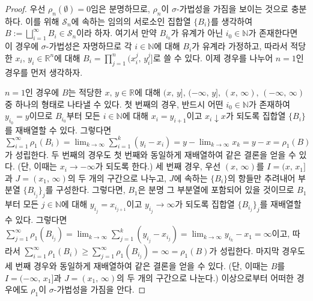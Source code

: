 \begin{proof}
    우선 $\rho_n(\emptyset)=0$임은 분명하므로, $\rho_n$이 $\sigma$-가법성을 가짐을 보이는 것으로 충분하다. 이를 위해 $\mathcal{S}_n$에 속하는 임의의 서로소인 집합열 $\{B_i\}$를 생각하여 $B:=\bigsqcup_{i=1}^\infty B_i\in\mathcal{S}_n$이라 하자. 여기서 만약 $B_{i_0}$가 유계가 아닌 $i_0\in\mathbb{N}$가 존재한다면 이 경우에 $\sigma$-가법성은 자명하므로 각 $i\in\mathbb{N}$에 대해 $B_i$가 유계라 가정하고, 따라서 적당한 $x_i,\,y_i\in\mathbb{R}^n$에 대해 $B_i=\prod_{j=1}^n(x_i^j,\,y_i^j]$로 쓸 수 있다. 이제 경우를 나누어 $n=1$인 경우를 먼저 생각하자.

    $n=1$인 경우에 $B$는 적당한 $x,\,y\in\mathbb{R}$에 대해 $(x,\,y],\,(-\infty,\,y],\,(x,\,\infty),\,(-\infty,\,\infty)$ 중 하나의 형태로 나타낼 수 있다. 첫 번째의 경우, 반드시 어떤 $i_0\in\mathbb{N}$가 존재하여 $y_{i_0}=y$이므로 $B_{i_0}$부터 모든 $i\in\mathbb{N}$에 대해 $x_i=y_{i+1}$이고 $x_i\downarrow x$가 되도록 집합열 $\{B_i\}$를  재배열할 수 있다. 그렇다면 $\sum_{i=1}^\infty\rho_1(B_i)=\lim_{k\to\infty}\sum_{i=1}^k(y_i-x_i)=y-\lim_{k\to\infty}x_k=y-x=\rho_1(B)$가 성립한다. 두 번째의 경우도 첫 번째와 동일하게 재배열하여 같은 결론을 얻을 수 있다. (단, 이때는 $x_i\to-\infty$가 되도록 한다.) 세 번째 경우, 우선 $(x,\,\infty)$를 $I=(x,\,x_1]$과 $J=(x_1,\,\infty)$의 두 개의 구간으로 나누고, $J$에 속하는 $\{B_i\}$의 항들만 추려내어 부분열 $\{B_{i_j}\}_j$를 구성한다. 그렇다면, $B_1$은 분명 그 부분열에 포함되어 있을 것이므로 $B_1$부터 모든 $j\in\mathbb{N}$에 대해 $y_{i_j}=x_{i_{j+1}}$이고 $y_{i_j}\to\infty$가 되도록 집합열 $\{B_{i_j}\}_j$를 재배열할 수 있다. 그렇다면 $\sum_{j=1}^\infty\rho_1(B_{i_j})=\lim_{k\to\infty}\sum_{j=1}^k(y_{i_j}-x_{i_j})=\lim_{k\to\infty}y_{i_k}-x_1=\infty$이고, 따라서 $\sum_{i=1}^\infty\rho_1(B_i)\geq\sum_{j=1}^\infty\rho_1(B_{i_j})=\infty=\rho_1(B)$가 성립한다. 마지막 경우도 세 번째 경우와 동일하게 재배열하여 같은 결론을 얻을 수 있다. (단, 이때는 $B$를 $I=(-\infty,\,x_1]$과 $J=(x_1,\,\infty)$의 두 개의 구간으로 나눈다.) 이상으로부터 어떠한 경우에도 $\rho_1$이 $\sigma$-가법성을 가짐을 안다.


\end{proof}

